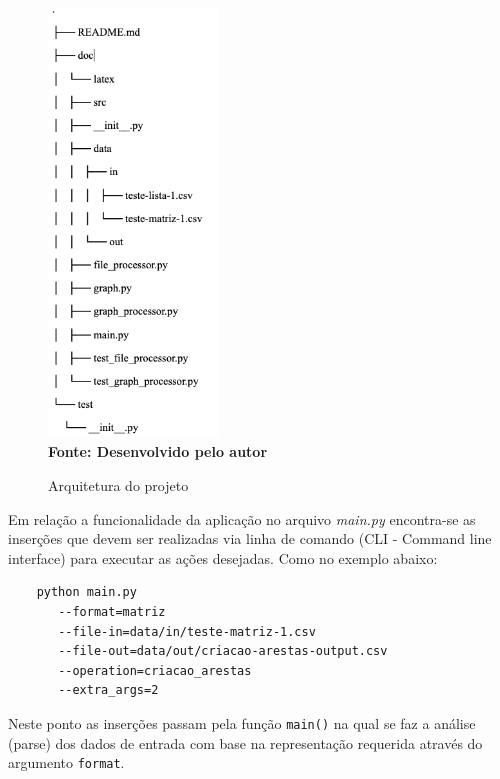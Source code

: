 \begin{figure}[ht]
	\centering	
	\caption[\hspace{0.1cm}Arquitetura do projeto.]{Arquitetura do projeto}
	\vspace{-0.4cm}
	\includegraphics[width=0.4\textwidth]{figuras/organizacao-projeto.png}
	 \vspace{-0.2cm}
	\\\textbf{\footnotesize Fonte: Desenvolvido pelo autor}
	\label{fig:figura1}
\end{figure}
\vspace{2cm}

Em relação a funcionalidade da aplicação no arquivo \emph{main.py} encontra-se as inserções que devem ser realizadas via linha de comando (CLI - Command line interface) para executar as ações desejadas. Como no exemplo abaixo:


\begin{lstlisting}
    python main.py 
       --format=matriz 
       --file-in=data/in/teste-matriz-1.csv 
       --file-out=data/out/criacao-arestas-output.csv 
       --operation=criacao_arestas 
       --extra_args=2
\end{lstlisting}

Neste ponto as inserções passam pela função \texttt{main()} na qual se faz a análise (parse) dos dados de entrada com base na representação requerida através do argumento \texttt{format}. 

